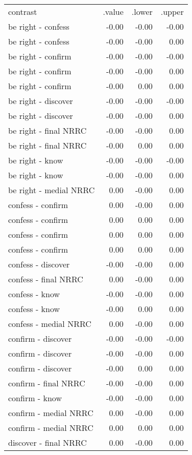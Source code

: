 \begin{longtable}{lrrr}
 contrast & .value & .lower & .upper \\ 
 be right - confess & -0.00 & -0.00 & -0.00 \\ 
  be right - confess & -0.00 & -0.00 & 0.00 \\ 
  be right - confirm & -0.00 & -0.00 & -0.00 \\ 
  be right - confirm & -0.00 & -0.00 & 0.00 \\ 
  be right - confirm & -0.00 & 0.00 & 0.00 \\ 
  be right - discover & -0.00 & -0.00 & -0.00 \\ 
  be right - discover & -0.00 & -0.00 & 0.00 \\ 
  be right - final NRRC & -0.00 & -0.00 & 0.00 \\ 
  be right - final NRRC & -0.00 & 0.00 & 0.00 \\ 
  be right - know & -0.00 & -0.00 & -0.00 \\ 
  be right - know & -0.00 & -0.00 & 0.00 \\ 
  be right - medial NRRC & 0.00 & -0.00 & 0.00 \\ 
  confess - confirm & 0.00 & -0.00 & 0.00 \\ 
  confess - confirm & 0.00 & 0.00 & 0.00 \\ 
  confess - confirm & 0.00 & 0.00 & 0.00 \\ 
  confess - confirm & 0.00 & 0.00 & 0.00 \\ 
  confess - discover & -0.00 & -0.00 & 0.00 \\ 
  confess - final NRRC & 0.00 & -0.00 & 0.00 \\ 
  confess - know & -0.00 & -0.00 & 0.00 \\ 
  confess - know & -0.00 & 0.00 & 0.00 \\ 
  confess - medial NRRC & 0.00 & -0.00 & 0.00 \\ 
  confirm - discover & -0.00 & -0.00 & -0.00 \\ 
  confirm - discover & -0.00 & -0.00 & 0.00 \\ 
  confirm - discover & -0.00 & 0.00 & 0.00 \\ 
  confirm - final NRRC & -0.00 & -0.00 & 0.00 \\ 
  confirm - know & -0.00 & -0.00 & 0.00 \\ 
  confirm - medial NRRC & 0.00 & -0.00 & 0.00 \\ 
  confirm - medial NRRC & 0.00 & 0.00 & 0.00 \\ 
  discover - final NRRC & 0.00 & -0.00 & 0.00 \\ 

\end{longtable}
